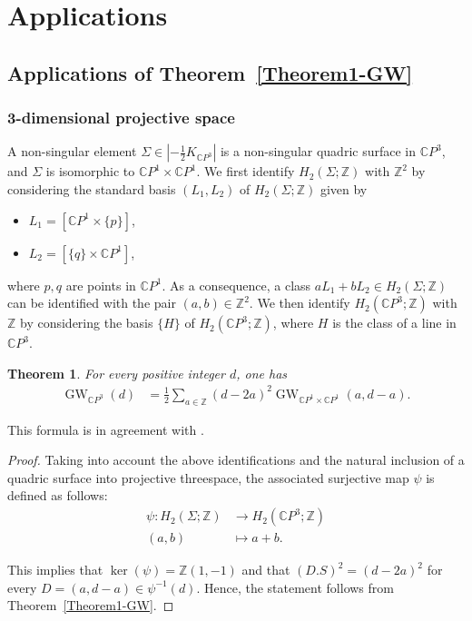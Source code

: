 \documentclass[11pt]{amsart}
\numberwithin{equation}{section}
\theoremstyle{definition}
\theoremstyle{plain}
\newtheorem{theorem}[definition]{Theorem}
\theoremstyle{remark}
\newcommand{\Z}{\mathbb{Z}}
\newcommand{\C}{\mathbb{C}}
\newcommand{\cpp}{\mathbb{C}P^3}
\newcommand{\pp}{\mathbb{C}P^1\times \mathbb{C}P^1}
\DeclareMathOperator{\GW}{GW}
\begin{document}
\section{Applications}
\label{applications}
\subsection{Applications of Theorem~\ref{Theorem1-GW}} \label{sect-applications.GW}

\subsubsection{3-dimensional projective space}
A non-singular element $\Sigma\in |-\frac{1}{2}K_{\cpp}|$ is a non-singular quadric surface in $\cpp$, and $\Sigma$ is isomorphic to $\pp$.     We first identify $H_2(\Sigma;\mathbb{Z})$ with  $\Z^2$ by considering the standard basis $(L_1,L_2)$ of $H_2(\Sigma;\mathbb{Z})$ given by
\begin{itemize}
    \item $L_1=[\C P^1\times\{p\}]$,
    \item $L_2=[\{q\}\times \C P^1]$,
\end{itemize}
 where $p,q$ are points in $\C P^1$. As a consequence, a class $a L_1+b L_2\in H_2(\Sigma;\mathbb{Z})$ can be identified with the pair $(a,b)\in \Z^2$. We then identify $H_2(\C P^3;\mathbb{Z})$ with  $\Z$ by considering the basis  $\{H\}$ of $H_2(\C P^3;\mathbb{Z})$, where $H$ is the class of a line in $\C P^3$.

\begin{theorem} \label{Theorem-GW.in.deg.8}
For every positive integer $d$, one has
\begin{align*}
        \GW_{\cpp}(d) &=\frac{1}{2}\sum_{a\in \mathbb{Z}}(d-2a)^2 \GW_{\pp}(a,d-a).
        \end{align*}
\end{theorem}

This formula is in agreement with \cite[Theorem 2]{brugalle2016pencils}.

\begin{proof}
Taking into account the above identifications and the natural inclusion of a quadric surface into projective threespace, the associated surjective map $\psi$ is defined as follows:
    \begin{align*}
        \psi\colon H_2(\Sigma;\mathbb{Z})&\longrightarrow H_2(\C P^3;\mathbb{Z})\\
        (a,b)&\longmapsto a+b.
    \end{align*}
    
This implies that $\ker(\psi)=\Z(1,-1)$ and that $(D.S)^2=(d-2a)^2$ for every $D=(a,d-a)\in \psi^{-1}(d)$. Hence, the statement follows from Theorem~\ref{Theorem1-GW}.
\end{proof}
\end{document}
